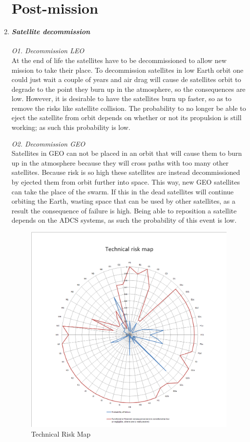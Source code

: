 \begin{enumerate}[A]
\section{Post-mission}
\label{blTRAPm}
	\item\textbf{\textit{Satellite decommission}} \\\\
\textit{O1. Decommission LEO}\\ 
At the end of life the satellites have to be decommissioned to allow new mission to take their place. To decommission satellites in low Earth orbit one could just wait a couple of years and air drag will cause de satellites orbit to degrade to the point they burn up in the atmosphere, so the consequences are low. However, it is desirable to have the satellites burn up faster, so as to remove the risks like satellite collision. The probability to no longer be able to eject the satellite from orbit depends on whether or not its propulsion is still working; as such this probability is low.

\textit{O2. Decommission GEO}\\ 
Satellites in GEO can not be placed in an orbit that will cause them to burn up in the atmosphere because they will cross paths with too many other satellites. Because risk is so high these satellites are instead decommissioned by ejected them from orbit further into space. This way, new GEO satellites can take the place of the swarm. If this in the dead satellites will continue orbiting the Earth, wasting space that can be used by other satellites, as a result the consequence of failure is high. Being able to reposition a satellite depends on the ADCS systems, as such the probability of this event is low.

\begin{figure} [h]
	\begin{center}
 \includegraphics[width=1.0\textwidth,angle=0]{chapters/img/TRA_RM.png}	
	\caption{Technical Risk Map}
	\label{TRA_RM}
	\end{center}
\end{figure}

\end{enumerate}